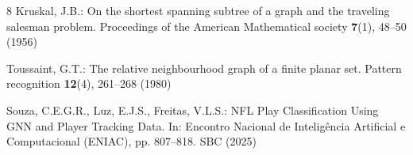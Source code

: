 \documentclass[runningheads]{llncs}
\begin{document}
\begin{thebibliography}{8}
Kruskal, J.B.: On the shortest spanning subtree of a graph and the traveling salesman problem. Proceedings of the American Mathematical society \textbf{7}(1), 48--50 (1956)

Toussaint, G.T.: The relative neighbourhood graph of a finite planar set. Pattern recognition \textbf{12}(4), 261--268 (1980)





Souza, C.E.G.R., Luz, E.J.S., Freitas, V.L.S.: NFL Play Classification Using GNN and Player Tracking Data. In: Encontro Nacional de Inteligência Artificial e Computacional (ENIAC), pp. 807--818. SBC (2025)




\end{thebibliography}
\end{document}
